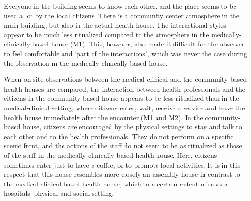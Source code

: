 \par
Everyone in the building seems to know each other, and the place seems to be used a lot by the local citizens. There is a community center atmosphere in the main building, but also in the actual health house. The interactional styles appear to be much less ritualized compared to the atmosphere in the medically-clinically based house (M1). This, however, also made it difficult for the observer to feel comfortable and ‘part of the interactions’, which was never the case during the observation in the medically-clinically based house.
\par
When on-site observations between the medical-clinical and the community-based health houses are compared, the interaction between health professionals and the citizens in the community-based house appears to be less ritualized than in the medical-clinical setting, where citizens enter, wait, receive a service and leave the health house immediately after the encounter (M1 and M2). In the community-based house, citizens are encouraged by the physical settings to stay and talk to each other and to the health professionals. They do not perform on a specific scenic front, and the actions of the staff do not seem to be as ritualized as those of the staff in the medically-clinically based health house. Here, citizens sometimes enter just to have a coffee, or to promote local activities. It is in this respect that this house resembles more closely an assembly house in contrast to the medical-clinical based health house, which to a certain extent mirrors a hospitals’ physical and social setting. 

